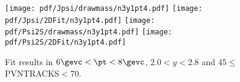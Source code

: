 \begin{figure}[H]
\begin{center}
\texttt{[image: pdf/Jpsi/drawmass/n3y1pt4.pdf]}
\texttt{[image: pdf/Jpsi/2DFit/n3y1pt4.pdf]}
\vspace*{-0.5cm}
\texttt{[image: pdf/Psi2S/drawmass/n3y1pt4.pdf]}
\texttt{[image: pdf/Psi2S/2DFit/n3y1pt4.pdf]}
\vspace*{-0.5cm}
\end{center}
\caption{Fit results in $6\gevc<\pt<8\gevc$, $2.0<y<2.8$ and 45$\leq$PVNTRACKS$<$70.}
\label{Fitn3y1pt4}
\end{figure}

